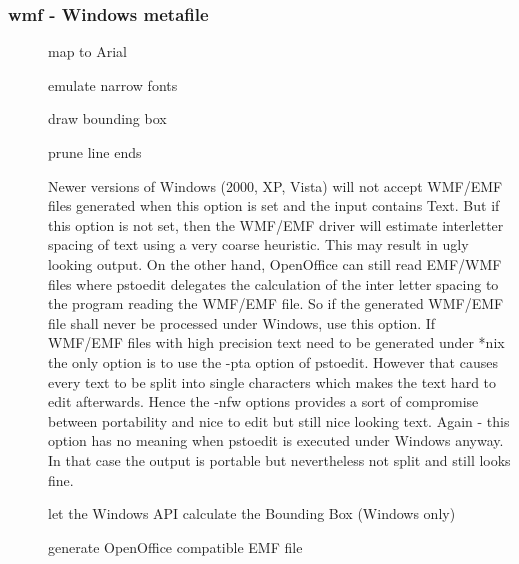 \documentclass[english,a4paper]{article}
\begin{document}
\subsubsection{wmf - Windows metafile}
\begin{description}
\item[] 
map to Arial


\item[] 
emulate narrow fonts


\item[] 
draw bounding box


\item[] 
prune line ends


\item[] 
Newer versions of Windows (2000, XP, Vista) will not accept WMF/EMF files generated when this option is set and the input contains Text. But if this option is not set, then the WMF/EMF driver will estimate interletter spacing of text using a very coarse heuristic. This may result in ugly looking output. On the other hand, OpenOffice can still read EMF/WMF files where pstoedit delegates the calculation of the inter letter spacing to the program reading the WMF/EMF file. So if the generated WMF/EMF file shall never be processed under Windows, use this option. If WMF/EMF files with high precision text need to be generated under *nix the only option is to use the -pta option of pstoedit. However that causes every text to be split into single characters which makes the text hard to edit afterwards. Hence the -nfw options provides a sort of compromise between portability and nice to edit but still nice looking text. Again - this option has no meaning when pstoedit is executed under Windows anyway. In that case the output is portable but nevertheless not split and still looks fine.


\item[] 
let the Windows API calculate the Bounding Box (Windows only)


\item[] 
generate OpenOffice compatible EMF file


\end{description}
\end{document}
